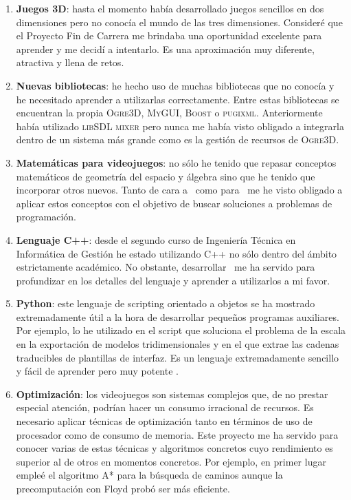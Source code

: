\documentclass[a4paper,11pt]{article}
\begin{document}
\begin{enumerate}
    \itemsep0em
    \item \textbf{Juegos 3D}: hasta el momento había desarrollado juegos
    sencillos en dos dimensiones pero no conocía el mundo de las tres dimensiones.
    Consideré que el Proyecto Fin de Carrera me brindaba una oportunidad
    excelente para aprender y me decidí a intentarlo. Es una aproximación
    muy diferente, atractiva y llena de retos.
    
    \item \textbf{Nuevas bibliotecas}: he hecho uso de muchas bibliotecas
    que no conocía y he necesitado aprender a utilizarlas correctamente.
    Entre estas bibliotecas se encuentran la propia \textsc{Ogre3D},
    \textsc{MyGUI}, \textsc{Boost} o \textsc{pugixml}. Anteriormente
    había utilizado \textsc{libSDL mixer} pero nunca me había visto obligado
    a integrarla dentro de un sistema más grande como es la gestión
    de recursos de \textsc{Ogre3D}.
    
    \item \textbf{Matemáticas para videojuegos}: no sólo he tenido que repasar
    conceptos matemáticos de geometría del espacio y álgebra sino que he
    tenido que incorporar otros nuevos. Tanto de cara a \wiki\ como para
    \juego\ me he visto obligado a aplicar estos conceptos con el objetivo
    de buscar soluciones a problemas de programación.
    
    \item \textbf{Lenguaje C++}: desde el segundo curso de Ingeniería
    Técnica en Informática de Gestión he estado utilizando C++ no sólo
    dentro del ámbito estrictamente académico. No obstante, desarrollar
    \juego\ me ha servido para profundizar en los detalles del lenguaje
    y aprender a utilizarlos a mi favor.
    
    \item \textbf{Python}: este lenguaje de scripting orientado a objetos
    se ha mostrado extremadamente útil a la hora de desarrollar
    pequeños programas auxiliares. Por ejemplo, lo he utilizado en el script
    que soluciona el problema de la escala en la exportación de modelos
    tridimensionales y en el que extrae las cadenas traducibles de plantillas
    de interfaz. Es un lenguaje extremadamente sencillo y fácil de aprender
    pero muy potente \cite{pilgr04}.
     
    \item \textbf{Optimización}: los videojuegos son sistemas complejos
    que, de no prestar especial atención, podrían hacer un consumo irracional
    de recursos. Es necesario aplicar técnicas de optimización tanto en
    términos de uso de procesador como de consumo de memoria. Este proyecto
    me ha servido para conocer varias de estas técnicas y algoritmos concretos
    cuyo rendimiento es superior al de otros en momentos concretos. Por ejemplo,
    en primer lugar empleé el algoritmo A* para la búsqueda de caminos
    aunque la precomputación con Floyd probó ser más eficiente.
    

\end{enumerate}
\end{document}
